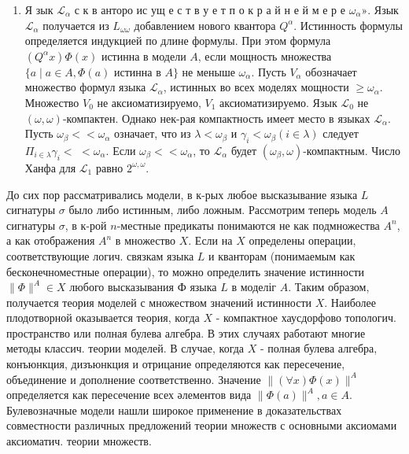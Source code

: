 \documentclass[10pt]{article}
\begin{document}
\begin{enumerate}
  \item Я зык $\mathscr{L}_{\alpha}$ с к в анторо ис ущ е с т в у е т п о к р а й н е й м е р е $\omega_{\alpha} »$. Язык $\mathscr{L}_{\alpha}$ получается из $L_{\omega \omega}$ добавлением нового квантора $Q^{\alpha}$. Истинность формулы определяется индукцией по длине формулы. При этом формула $\left(Q^{\alpha} x\right) \Phi(x)$ истинна в модели $A$, если мощность множества $\{a \mid a \in A, \Phi(a)$ истинна в $A\}$ не меныше $\omega_{\alpha}$. Пусть $V_{\alpha}$ обозначает множество формул языка $\mathscr{L}_{\alpha}$, истинных во всех моделях мощности $\geqslant \omega_{\alpha}$. Множество $V_{0}$ не аксиоматизируемо, $V_{1}$ аксиоматизируемо. Язык $\mathscr{L}_{0}$ не $(\omega, \omega)$-компактен. Однако нек-рая компактность имеет место в языках $\mathscr{L}_{\alpha}$. Пусть $\omega_{\beta}<<\omega_{\alpha}$ означает, что из $\lambda<\omega_{\beta}$ и $\gamma_{i}<\omega_{\beta}(i \in \lambda)$ следует $\Pi_{i \in \lambda} \gamma_{i}<$ $<\omega_{\alpha}$. Если $\omega_{\beta}<<\omega_{\alpha}$, то $\mathscr{L}_{\alpha}$ будет $\left(\omega_{\beta}, \omega\right)$-компактным. Число Ханфа для $\mathscr{L}_{1}$ равно $2^{\omega, \omega}$.



\end{enumerate}



До сих пор рассматривались модели, в к-рых любое высказывание языка $L$ сигнатуры $\sigma$ было либо истинным, либо ложным. Рассмотрим теперь модель $A$ сигнатуры $\sigma$, в к-рой $n$-местные предикаты понимаются не как подмножества $A^{n}$, а как отображения $A^{n}$ в множество $X$. Если на $X$ определены операции, соответствующие логич. связкам языка $L$ и кванторам (понимаемым как бесконечноместные операции), то можно определить значение истинности $\|\Phi\|^{A} \in X$ любого высказывания Ф языка $L$ в моделіг $A$. Таким образом, получается теория моделей с множеством значений истинности $X$. Наиболее плодотворной оказывается теория, когда $X$ - компактное хаусдорфово топологич. пространство или полная булева алгебра. В этих случаях работают многие методы классич. теории моделей. В случае, когда $X$ - полная булева алгебра, конъюнкция, дизъюнкция и отрицание определяются как пересечение, объединение и дополнение соответственно. Значение $\|(\forall x) \Phi(x)\|^{A}$ определяется как пересечение всех әлементов вида $\|\Phi(a)\|^{A}, a \in A$. Булевозначные модели нашли широкое применение в доказательствах совместности различных предложений теории множеств с основными аксиомами аксиоматич. теории множеств.
\end{document}
